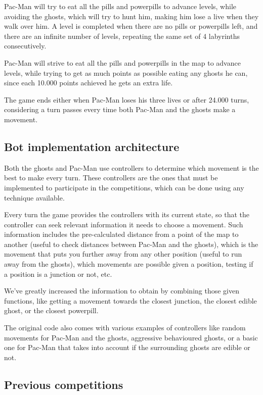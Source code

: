 \documentclass{llncs}
\newcommand{\paco}{Pac-Man }
\begin{document}
\paco will try to eat all the pills and powerpills to advance levels, while avoiding the ghosts, which will try to hunt him, making him lose a live when they walk over him. A level is completed when there are no pills or powerpills left, and there are an infinite number of levels, repeating the same set of 4 labyrinths consecutively.

\paco will strive to eat all the pills and powerpills in the map to advance levels, while trying to get as much points as possible eating any ghosts he can, since each 10.000 points achieved he gets an extra life.

The game ends either when \paco loses his three lives or after 24.000 turns, considering a turn passes every time both \paco and the ghosts make a movement.

\subsection{Bot implementation architecture}

Both the ghosts and \paco use controllers to determine which movement is the best to make every turn. These controllers are the ones that must be implemented to participate in the competitions, which can be done using any technique available.

Every turn the game provides the controllers with its current state, so that the controller can seek relevant information it needs to choose a movement. Such information includes the pre-calculated distance from a point of the map to another (useful to check distances between \paco and the ghosts), which is the movement that puts you further away from any other position (useful to run away from the ghosts), which movements are possible given a position, testing if a position is a junction or not, etc. 

We've greatly increased the information to obtain by combining those given functions, like getting a movement towards the closest junction, the closest edible ghost, or the closest powerpill.

The original code also comes with various examples of controllers like random movements for \paco and the ghosts, aggressive behavioured ghosts, or a basic one for \paco that takes into account if the surrounding ghosts are edible or not.

\subsection{Previous competitions}
\end{document}
